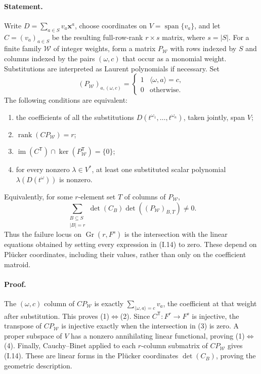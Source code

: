 \paragraph{Statement.}
Write $D=\sum_{a\in S}v_a\mathbf x^a$, choose coordinates on
$V=\operatorname{span}\{v_a\}$, and let $C=(v_a)_{a\in S}$ be the
resulting full-row-rank $r\times s$ matrix, where $s=|S|$.
For a finite family $\mathcal W$ of integer weights, form a matrix
$P_{\mathcal W}$ with rows indexed by $S$ and columns indexed by
the pairs $(\omega,c)$ that occur as a monomial weight.  Substitutions
are interpreted as Laurent polynomials if necessary.  Set
\[
 (P_{\mathcal W})_{a,(\omega,c)}
   =\begin{cases}1&\langle\omega,a\rangle=c,\\0&\text{otherwise.}\end{cases}
\]
The following conditions are equivalent:
\begin{enumerate}
\item the coefficients of all the substitutions
$D(t^{\omega_1},\ldots,t^{\omega_n})$, taken jointly, span $V$;
\item $\operatorname{rank}(CP_{\mathcal W})=r$;
\item $\operatorname{im}(C^{\mathsf T})\cap
\ker(P_{\mathcal W}^{\mathsf T})=\{0\}$;
\item for every nonzero $\lambda\in V^*$, at least one substituted
scalar polynomial $\lambda(D(t^\omega))$ is nonzero.
\end{enumerate}
Equivalently, for some $r$-element set $T$ of columns of $P_{\mathcal W}$,
\[
 \sum_{\substack{B\subseteq S\\|B|=r}}
   \det(C_B)\det((P_{\mathcal W})_{B,T})\ne0.
\tag{I.14}\label{eq:I-joint-Plucker}
\]
Thus the failure locus on $\operatorname{Gr}(r,F^s)$ is the
intersection with the linear equations obtained by setting every
expression in (I.14) to zero.  These depend on Pl\"ucker coordinates,
including their values, rather than only on the coefficient matroid.

\paragraph{Proof.}
The $(\omega,c)$ column of $CP_{\mathcal W}$ is exactly
$\sum_{\langle\omega,a\rangle=c}v_a$, the coefficient at that
weight after substitution.  This proves (1)$\Leftrightarrow$(2).
Since $C^{\mathsf T}:F^r\to F^s$ is injective, the transpose of
$CP_{\mathcal W}$ is injective exactly when the intersection in
(3) is zero.  A proper subspace of $V$ has a nonzero annihilating
linear functional, proving (1)$\Leftrightarrow$(4).  Finally,
Cauchy--Binet applied to each $r$-column submatrix of
$CP_{\mathcal W}$ gives (I.14).  These are linear forms in the
Pl\"ucker coordinates $\det(C_B)$, proving the geometric description.

